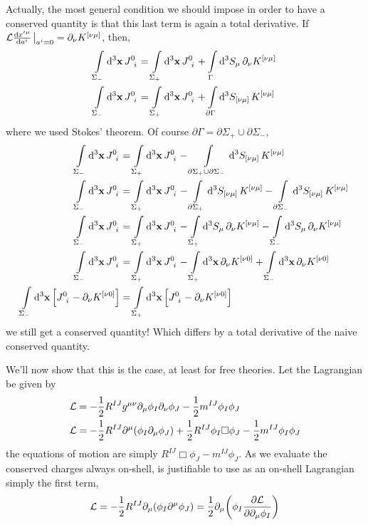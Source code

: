 Actually, the most general condition we should impose in order to have a conserved quantity is that this last term is again a total derivative. If $\mathcal L\dv{{x'}^\mu}{a^i}\eval_{a^i=0}=\partial_\nu K^{\qty[\nu\mu]}$, then,
\begin{align}
    \int\limits_{\Sigma_-}\dd[3]{\vb x}\tensor{J}{^0_i}&=\int\limits_{\Sigma_+}\dd[3]{\vb x}\tensor{J}{^0_i}+\int\limits_{\Gamma}\dd[3]{S_\mu}\partial_\nu K^{\qty[\nu\mu]}\\
    \int\limits_{\Sigma_-}\dd[3]{\vb x}\tensor{J}{^0_i}&=\int\limits_{\Sigma_+}\dd[3]{\vb x}\tensor{J}{^0_i}+\int\limits_{\partial\Gamma}\dd[3]{S_{\qty[\nu\mu]}} K^{\qty[\nu\mu]}
\end{align}
where we used Stokes' theorem. Of course $\partial\Gamma = \partial\Sigma_+\cup \partial\Sigma_-$,
\begin{align}
    \int\limits_{\Sigma_-}\dd[3]{\vb x}\tensor{J}{^0_i}&=\int\limits_{\Sigma_+}\dd[3]{\vb x}\tensor{J}{^0_i}-\int\limits_{\partial\Sigma_+\cup \partial\Sigma_-}\dd[3]{S_{\qty[\nu\mu]}} K^{\qty[\nu\mu]}\\
    \int\limits_{\Sigma_-}\dd[3]{\vb x}\tensor{J}{^0_i}&=\int\limits_{\Sigma_+}\dd[3]{\vb x}\tensor{J}{^0_i}-\int\limits_{\partial\Sigma_+}\dd[3]{S_{\qty[\nu\mu]}} K^{\qty[\nu\mu]}-\int\limits_{\partial\Sigma_-}\dd[3]{S_{\qty[\nu\mu]}} K^{\qty[\nu\mu]}\\
    \int\limits_{\Sigma_-}\dd[3]{\vb x}\tensor{J}{^0_i}&=\int\limits_{\Sigma_+}\dd[3]{\vb x}\tensor{J}{^0_i}-\int\limits_{\Sigma_+}\dd[3]{S_{\mu}}\partial_\nu K^{\qty[\nu\mu]}-\int\limits_{\Sigma_-}\dd[3]{S_\mu}\partial_\nu K^{\qty[\nu\mu]}\\
    \int\limits_{\Sigma_-}\dd[3]{\vb x}\tensor{J}{^0_i}&=\int\limits_{\Sigma_+}\dd[3]{\vb x}\tensor{J}{^0_i}-\int\limits_{\Sigma_+}\dd[3]{\vb x}\partial_\nu K^{\qty[\nu0]}+\int\limits_{\Sigma_-}\dd[3]{\vb x}\partial_\nu K^{\qty[\nu0]}\\
    \int\limits_{\Sigma_-}\dd[3]{\vb x}\qty[\tensor{J}{^0_i}-\partial_\nu K^{\qty[\nu0]}]&=\int\limits_{\Sigma_+}\dd[3]{\vb x}\qty[\tensor{J}{^0_i}-\partial_\nu K^{\qty[\nu0]}]
\end{align}
we still get a conserved quantity! Which differs by a total derivative of the naive conserved quantity.

We'll now show that this is the case, at least for free theories. Let the Lagrangian be given by
\begin{align}
    \mathcal L &= -\frac12 R^{IJ}g^{\mu\nu}\partial_\mu\phi_I\partial_\nu\phi_J-\frac12 m^{IJ}\phi_I\phi_J\\
    \mathcal L &= -\frac12 R^{IJ}\partial^\mu\qty(\phi_I\partial_\mu\phi_J) +\frac12 R^{IJ}\phi_I\Box\phi_J-\frac12 m^{IJ}\phi_I\phi_J
\end{align}
the equations of motion are simply $R^{IJ}\Box\phi_J- m^{IJ}\phi_J$. As we evaluate the conserved charges always on-shell, 
is justifiable to use as an on-shell Lagrangian simply the first term,
\begin{align}
    \mathcal L = -\frac12 R^{IJ}\partial_\mu\qty(\phi_I\partial^\mu\phi_J) = \frac12 \partial_\mu\qty(\phi_I\pdv{\mathcal L}{\partial_\mu\phi_I})
\end{align}

